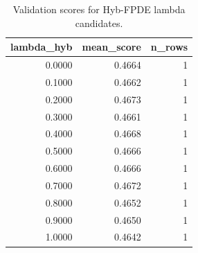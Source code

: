 \begin{table}[t]
\caption{Validation scores for Hyb-FPDE lambda candidates.}
\label{tab:lambda_distribution_computed}
\centering
\begin{tabular}{rrr}
\toprule
lambda\_hyb & mean\_score & n\_rows \\
\midrule
0.0000 & 0.4664 & 1 \\
0.1000 & 0.4662 & 1 \\
0.2000 & 0.4673 & 1 \\
0.3000 & 0.4661 & 1 \\
0.4000 & 0.4668 & 1 \\
0.5000 & 0.4666 & 1 \\
0.6000 & 0.4666 & 1 \\
0.7000 & 0.4672 & 1 \\
0.8000 & 0.4652 & 1 \\
0.9000 & 0.4650 & 1 \\
1.0000 & 0.4642 & 1 \\
\bottomrule
\end{tabular}

\end{table}

